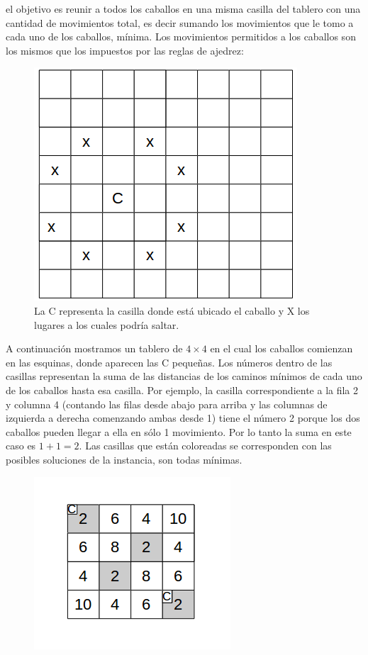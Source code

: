 el objetivo es reunir a todos los caballos en una misma casilla del tablero con una cantidad
de movimientos total, es decir sumando los movimientos que le tomo a cada uno de los caballos, mínima.
Los movimientos permitidos a los caballos son los mismos que los impuestos por las reglas de ajedrez:\\
\begin{figure}[H]
	\begin{minipage}[t]{\linewidth}
		\centering
		\includegraphics[scale=0.5]{show_jumps.png}
		\caption{La C representa la casilla donde está ubicado el caballo y X los lugares a los cuales podría saltar.
}
		\label{fig:p2_complejidad_varia_k}
	\end{minipage}
\end{figure}
A continuación mostramos un tablero de $4 \times 4$ en el cual los caballos comienzan en las esquinas, donde
aparecen las C pequeñas. Los números dentro de las casillas representan la suma de las distancias de los caminos
mínimos de cada uno de los caballos hasta esa casilla. Por ejemplo, la casilla correspondiente a la fila 2 y
columna 4 (contando las filas desde abajo para arriba y las columnas de izquierda a derecha comenzando ambas desde 1)
tiene el número 2 porque los dos caballos pueden llegar a ella en sólo 1 movimiento. Por lo tanto la suma en este
caso es $1 +1 = 2$. Las casillas que están coloreadas se corresponden con las posibles soluciones de la instancia,
son todas mínimas.
\begin{figure}[H]
	\begin{minipage}[t]{\linewidth}
		\centering
		\includegraphics[scale=0.5]{show_solution.png}
		\label{fig:p2_complejidad_varia_k}
	\end{minipage}
\end{figure}

